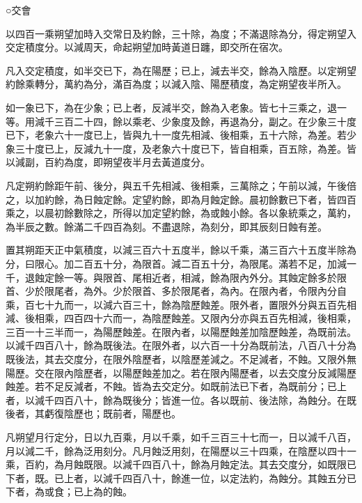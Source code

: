 \begin{pinyinscope}
 ○交會



 以四百一乘朔望加時入交常日及約餘，三十除，為度；不滿退除為分，得定朔望入交定積度分。以減周天，命起朔望加時黃道日躔，即交所在宿次。



 凡入交定積度，如半交已下，為在陽歷；已上，減去半交，餘為入陰歷。以定朔望約餘乘轉分，萬約為分，滿百為度；以減入陰、陽歷積度，為定朔望夜半所入。



 如一象已下，為在少象；已上者，反減半交，餘為入老象。皆七十三乘之，退一等。用減千三百二十四，餘以乘老、少象度及餘，再退為分，副之。在少象三十度已下，老象六十一度已上，皆與九十一度先相減、後相乘，五十六除，為差。若少象三十度已上，反減九十一度，及老象六十度已下，皆自相乘，百五除，為差。皆以減副，百約為度，即朔望夜半月去黃道度分。



 凡定朔約餘距午前、後分，與五千先相減、後相乘，三萬除之；午前以減，午後倍之，以加約餘，為日蝕定餘。定望約餘，即為月蝕定餘。晨初餘數已下者，皆四百乘之，以晨初餘數除之，所得以加定望約餘，為或蝕小餘。各以象統乘之，萬約，為半辰之數。餘滿二千四百為刻。不盡退除，為刻分，即其辰刻日蝕有差。



 置其朔距天正中氣積度，以減三百六十五度半，餘以千乘，滿三百六十五度半除為分，曰限心。加二百五十分，為限首。減二百五十分，為限尾。滿若不足，加減一千，退蝕定餘一等。與限首、尾相近者，相減，餘為限內外分。其蝕定餘多於限首、少於限尾者，為外。少於限首、多於限尾者，為內。在限內者，令限內分自乘，百七十九而一，以減六百三十，餘為陰歷蝕差。限外者，置限外分與五百先相減、後相乘，四百四十六而一，為陰歷蝕差。又限內分亦與五百先相減，後相乘，三百一十三半而一，為陽歷蝕差。在限內者，以陽歷蝕差加陰歷蝕差，為既前法。以減千四百八十，餘為既後法。在限外者，以六百一十分為既前法，八百八十分為既後法，其去交度分，在限外陰歷者，以陰歷差減之。不足減者，不蝕。又限外無陽歷。交在限內陰歷者，以陽歷蝕差加之。若在限內陽歷者，以去交度分反減陽歷蝕差。若不足反減者，不蝕。皆為去交定分。如既前法已下者，為既前分；已上者，以減千四百八十，餘為既後分；皆進一位。各以既前、後法除，為蝕分。在既後者，其虧復陰歷也；既前者，陽歷也。



 凡朔望月行定分，日以九百乘，月以千乘，如千三百三十七而一，日以減千八百，月以減二千，餘為泛用刻分。凡月蝕泛用刻，在陽歷以三十四乘，在陰歷以四十一乘，百約，為月蝕既限。以減千四百八十，餘為月蝕定法。其去交度分，如既限已下者，既。已上者，以減千四百八十，餘進一位，以定法約，為蝕分。其蝕五分已下者，為或食；已上為的蝕。




\end{pinyinscope}
